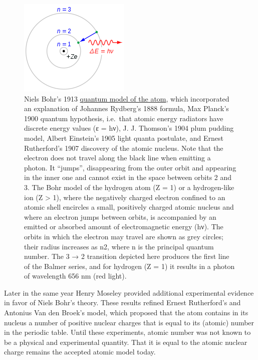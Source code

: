 \begin{figure}

{\centering \includegraphics[width=0.7\linewidth]{./figures/chemistry/Bohr_atom_model} 

}

\caption{Niels Bohr's 1913 \href{https://en.wikipedia.org/wiki/Bohr_model\#/media/File:Bohr_atom_model.svg}{quantum model of the atom}, which incorporated an explanation of Johannes Rydberg's 1888 formula, Max Planck's 1900 quantum hypothesis, i.e.~that atomic energy radiators have discrete energy values (ε = hν), J. J. Thomson's 1904 plum pudding model, Albert Einstein's 1905 light quanta postulate, and Ernest Rutherford's 1907 discovery of the atomic nucleus. Note that the electron does not travel along the black line when emitting a photon. It ``jumps'', disappearing from the outer orbit and appearing in the inner one and cannot exist in the space between orbits 2 and 3. The Bohr model of the hydrogen atom (Z = 1) or a hydrogen-like ion (Z \textgreater{} 1), where the negatively charged electron confined to an atomic shell encircles a small, positively charged atomic nucleus and where an electron jumps between orbits, is accompanied by an emitted or absorbed amount of electromagnetic energy (hν). The orbits in which the electron may travel are shown as grey circles; their radius increases as n2, where n is the principal quantum number. The 3 → 2 transition depicted here produces the first line of the Balmer series, and for hydrogen (Z = 1) it results in a photon of wavelength 656 nm (red light).}\label{fig:bohrmodel}
\end{figure}

Later in the same year Henry Moseley provided additional experimental evidence in favor of Niels Bohr's theory. These results refined Ernest Rutherford's and Antonius Van den Broek's model, which proposed that the atom contains in its nucleus a number of positive nuclear charges that is equal to its (atomic) number in the periodic table. Until these experiments, atomic number was not known to be a physical and experimental quantity. That it is equal to the atomic nuclear charge remains the accepted atomic model today.

